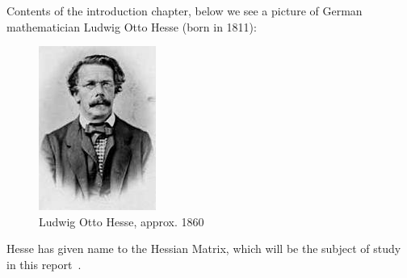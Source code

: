 \documentclass[../convex_optimization.tex]{subfiles}
\begin{document}
Contents of the introduction chapter, below we see a picture of German
mathematician Ludwig Otto Hesse (born in 1811):

\begin{figure}[H]
    \begin{center}
        \includegraphics[width=0.5\linewidth]{figures/ludwig_otto_hesse.jpg}
        \caption{Ludwig Otto Hesse, approx. 1860}
        \label{fig:hesse_picture}
    \end{center}
\end{figure}
Hesse has given name to the Hessian Matrix, which will be the subject of study
in this report~\cite{hessian_matrix}.
\end{document}
